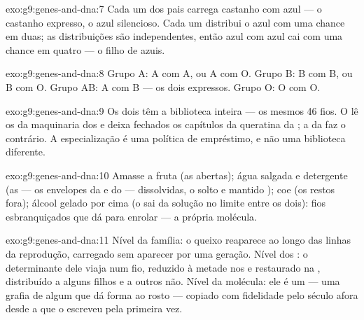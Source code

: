 \begin{solution}{exo:g9:genes-and-dna:7}
Cada um dos pais carrega castanho com azul --- o castanho
expresso, o azul silencioso. Cada um distribui o azul com uma
chance em duas; as distribuições são independentes, então
azul com azul cai com uma chance em quatro --- o filho de
 azuis.
\end{solution}

\begin{solution}{exo:g9:genes-and-dna:8}
Grupo A: A com A, ou A com O. Grupo B: B com B, ou B com O.
Grupo AB: A com B --- os dois expressos. Grupo O: O com O.
\end{solution}

\begin{solution}{exo:g9:genes-and-dna:9}
Os dois têm a biblioteca inteira --- os mesmos 46 fios. O
 lê os  da maquinaria dos  e deixa
fechados os capítulos da queratina da ; a  da 
faz o contrário. A especialização é uma política de
empréstimo, e não uma biblioteca diferente.
\end{solution}

\begin{solution}{exo:g9:genes-and-dna:10}
Amasse a fruta (as  abertas); água salgada e
detergente (as  --- os envelopes da  e do
 --- dissolvidas, o  solto e mantido );
coe (os restos fora); álcool gelado por cima (o  sai da
solução no limite entre os dois): fios esbranquiçados que dá
para enrolar --- a própria molécula.
\end{solution}

\begin{solution}{exo:g9:genes-and-dna:11}
Nível da família: o queixo reaparece ao longo das linhas da
reprodução, carregado sem aparecer por uma geração. Nível dos
: o determinante dele viaja num fio, reduzido à
metade nos  e restaurado na , distribuído a
alguns filhos e a outros não. Nível da molécula: ele é um
 --- uma grafia de algum  que dá forma ao rosto ---
copiado com fidelidade pelo século afora desde a  que
o escreveu pela primeira vez.
\end{solution}

